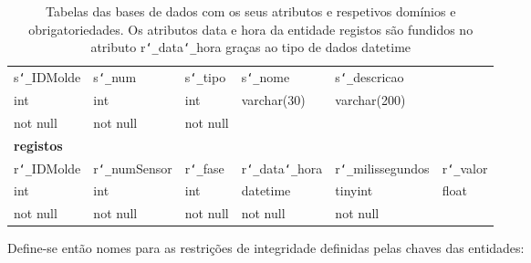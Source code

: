 \documentclass[11pt,twoside,a4paper]{report}
\begin{document}
\begin{table}[H]
\begin{tabular}{|l|l|l|l|l|l|}
		s\texttt{\char`_}IDMolde & s\texttt{\char`_}num & s\texttt{\char`_}tipo & s\texttt{\char`_}nome & s\texttt{\char`_}descricao & \multicolumn{1}{l}{}\\ \cline{1-5}
		int & int & int & varchar(30) & varchar(200) & \multicolumn{1}{l}{}\\ \cline{1-5}
		not null & not null & not null & & & \multicolumn{1}{l}{}\\ \cline{1-5}
		\multicolumn{6}{l}{\textbf{registos}}\\ \hline
		r\texttt{\char`_}IDMolde & r\texttt{\char`_}numSensor & r\texttt{\char`_}fase &  r\texttt{\char`_}data\texttt{\char`_}hora & r\texttt{\char`_}milissegundos & r\texttt{\char`_}valor\\ \hline
		int & int & int & datetime & tinyint & float\\ \hline
		not null & not null & not null & not null & not null & \\ \hline
	\end{tabular}
	\caption[Tabelas das bases de dados com os seus atributos e respetivos domínios e obrigatoriedades]{Tabelas das bases de dados com os seus atributos e respetivos domínios e obrigatoriedades. Os atributos data e hora da entidade registos são fundidos no atributo r\texttt{\char`_}data\texttt{\char`_}hora graças ao tipo de dados datetime}
	\label{tab:dominio}
\end{table}
Define-se então nomes para as restrições de integridade definidas pelas chaves das entidades:
\end{document}
